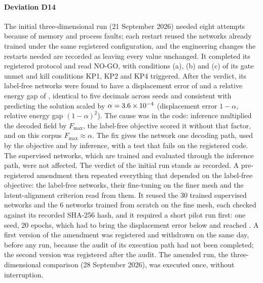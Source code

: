 \paragraph{Deviation D14}
The initial three-dimensional run (21 September 2026) needed eight attempts because of
memory and process faults; each restart reused the networks already trained under the same
registered configuration, and the engineering changes the restarts needed are recorded as
leaving every value unchanged. It completed its registered protocol and read NO-GO, with
conditions (a), (b) and (c) of its gate unmet and kill conditions KP1, KP2 and KP4
triggered. After the verdict, its label-free networks were found to have a displacement
error of \numDfourteenDisp{} and a relative energy gap of \numDfourteenGap{}, identical to
five decimals across seeds and consistent with predicting the solution scaled by
$\alpha=3.6 \times 10^{-4}{}$ (displacement error $1-\alpha$, relative energy gap
$(1-\alpha)^2$). The cause was in the code: inference multiplied the decoded field by
$F_{\max}$, the label-free objective scored it without that factor, and on this corpus
$F_{\max}\approx\alpha$. The fix gives the network one decoding path, used by the objective
and by inference, with a test that fails on the registered code. The supervised networks,
which are trained and evaluated through the inference path, were not affected. The verdict
of the initial run stands as recorded. A pre-registered amendment then repeated everything
that depended on the label-free objective: the label-free networks, their fine-tuning on
the finer mesh and the latent-alignment criterion read from them. It reused the 30 trained
supervised networks and the 6 networks trained from scratch on the fine mesh, each checked
against its recorded SHA-256 hash, and it required a short pilot run first: one seed, 20
epochs, which had to bring the displacement error below \numPilotLimit{} and reached
\numPilotDisp{}. A first version of the amendment was registered and withdrawn on the same
day, before any run, because the audit of its execution path had not been completed; the
second version was registered after the audit. The amended run, the three-dimensional
comparison (28 September 2026), was executed once, without interruption.

